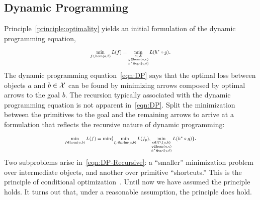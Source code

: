 \documentclass[a4paper]{ifacconf}
\begin{document}
\subsection{Dynamic Programming}
Principle~\ref{principle:optimality} yields an initial formulation of the dynamic programming equation,
\begin{equation}
  \label{eqn:DP}
  \scalebox{0.7}{\mbox{\ensuremath{\displaystyle%
  \min_{f \in \HomSet(a,b)} \Loss(f) 
    =
      \min_{
        \begin{subarray}{c}
          c   \in \mathcal{X}\\
          g   \in \HomSet(a, c)\\
          h^* \in \OptSet(c, b)
        \end{subarray}
      }{
        \Loss(h^* \circ g)
      }
  }}}.
\end{equation}
%
The dynamic programming equation~\eqref{eqn:DP} says that the optimal loss between objects \(a\) and \(b\in\mathcal{X}\) can be found by minimizing arrows composed by optimal arrows to the goal \(b.\)
The recursion typically associated with the dynamic programming equation is not apparent in~\eqref{eqn:DP}.
Split the minimization between the primitives to the goal and the remaining arrows to arrive at a formulation that reflects the recursive nature of dynamic programming:
%
\begin{equation}
  \label{eqn:DP-Recursive}
  \scalebox{0.7}{\mbox{\ensuremath{\displaystyle%
    \min_{f \in \HomSet(a,b)} \Loss(f) 
      =
        \min_{}\{
          \min_{f_p \in \PrimSet(a,b)}{\Loss(f_p)},
          \min_{
            \begin{subarray}{c}
              c   \in \mathcal{X} \setminus \{a, b\}\\
              g   \in \HomSet(a, c)\\
              h^* \in \OptSet(c, b)
            \end{subarray}
          }{
            \Loss(h^* \circ g)
          }
        \}}}}.
\end{equation}
%
Two subproblems arise in~\eqref{eqn:DP-Recursive}:
a ``smaller'' minimization problem over intermediate objects, and another over primitive ``shortcuts.''
This is the principle of conditional optimization~\citep{sniedovich_dynamic_1992}.
%
Until now we have assumed the principle holds.
It turns out that, under a reasonable assumption, the principle does hold.
\end{document}
